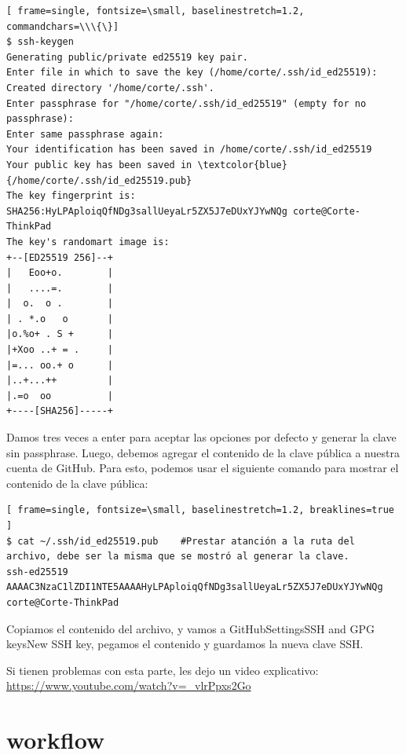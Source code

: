 \documentclass[a4paper,12pt]{report}
\begin{document}
\begin{Verbatim}[ frame=single, fontsize=\small, baselinestretch=1.2,  commandchars=\\\{\}]
$ ssh-keygen
Generating public/private ed25519 key pair.
Enter file in which to save the key (/home/corte/.ssh/id_ed25519): 
Created directory '/home/corte/.ssh'.
Enter passphrase for "/home/corte/.ssh/id_ed25519" (empty for no passphrase): 
Enter same passphrase again: 
Your identification has been saved in /home/corte/.ssh/id_ed25519
Your public key has been saved in \textcolor{blue}{/home/corte/.ssh/id_ed25519.pub}
The key fingerprint is:
SHA256:HyLPAploiqQfNDg3sallUeyaLr5ZX5J7eDUxYJYwNQg corte@Corte-ThinkPad
The key's randomart image is:
+--[ED25519 256]--+
|   Eoo+o.        |
|   ....=.        |
|  o.  o .        |
| . *.o   o       |
|o.%o+ . S +      |
|+Xoo ..+ = .     |
|=... oo.+ o      |
|..+...++         |
|.=o  oo          |
+----[SHA256]-----+
\end{Verbatim}

Damos tres veces a enter para aceptar las opciones por defecto y generar la clave sin passphrase.
Luego, debemos agregar el contenido de la clave pública a nuestra cuenta de GitHub.
Para esto, podemos usar el siguiente comando para mostrar el contenido de la clave pública:
\begin{Verbatim}[ frame=single, fontsize=\small, baselinestretch=1.2, breaklines=true ]
$ cat ~/.ssh/id_ed25519.pub    #Prestar atanción a la ruta del archivo, debe ser la misma que se mostró al generar la clave.
ssh-ed25519 AAAAC3NzaC1lZDI1NTE5AAAAHyLPAploiqQfNDg3sallUeyaLr5ZX5J7eDUxYJYwNQg corte@Corte-ThinkPad
\end{Verbatim}

Copiamos el contenido del archivo, y vamos a GitHub\textrightarrow Settings\textrightarrow SSH and GPG keys\textrightarrow New SSH key,
pegamos el contenido y guardamos la nueva clave SSH.

Si tienen problemas con esta parte, les dejo un video explicativo: \url{https://www.youtube.com/watch?v=_vlrPpxs2Go}


\section{workflow}

\end{document}
